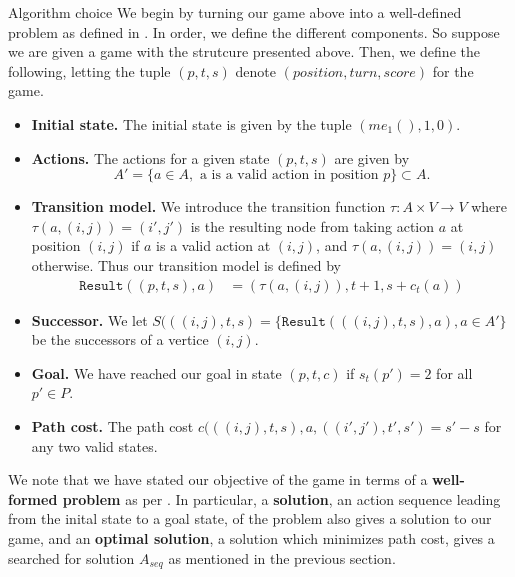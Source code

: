 \begin{section}{Algorithm choice}
  We begin by turning our game above into a well-defined problem as defined in \cite{rn}. In order, we define the different components. So suppose we are given a game with the strutcure presented above. Then, we define the following, letting the tuple $(p, t, s)$ denote $(position, turn, score)$ for the game.

  \begin{itemize}
  \item \textbf{Initial state.} The initial state is given by the tuple $(me_1(), 1, 0)$.

  \item \textbf{Actions.} The actions for a given state $(p, t, s)$ are given by
    \begin{equation*}
      A' = \{ a \in A,\text{ a is a valid action in position }p \} \subset A.
    \end{equation*}

  \item \textbf{Transition model.} We introduce the transition function $\tau: A\times V \rightarrow V$ where $\tau(a, (i, j)) = (i', j')$ is the resulting node from taking action $a$ at position $(i, j)$ if $a$ is a valid action at $(i,j)$, and $\tau(a, (i,j)) = (i,j)$ otherwise. Thus our transition model is defined by
    \begin{equation*}
      \begin{split}
        \texttt{Result}( (p, t, s), a ) &= ( \tau(a, (i,j)),
        t+1, s+c_t(a))
      \end{split}
    \end{equation*}

    
  \item \textbf{Successor.} We let $S(((i, j), t, s) = \{\texttt{Result}(((i,j), t, s), a), a\in A' \}$ be the successors of a vertice $(i, j)$.

  \item \textbf{Goal.} We have reached our goal in state $(p, t, c)$ if $s_t(p') = 2$ for all $p' \in P$.

  \item \textbf{Path cost.} The path cost $c(((i,j),t,s), a, ((i',j'),t',s') = s'-s$ for any two valid states.
\end{itemize}
We note that we have stated our objective of the game in terms of a \textbf{well-formed problem} as per \cite{rn}. In particular, a \textbf{solution}, an action sequence leading from the inital state to a goal state, of the problem also gives a solution to our game, and an \textbf{optimal solution}, a solution which minimizes path cost, gives a searched for solution $A_{seq}$ as mentioned in the previous section. 


\end{section}
